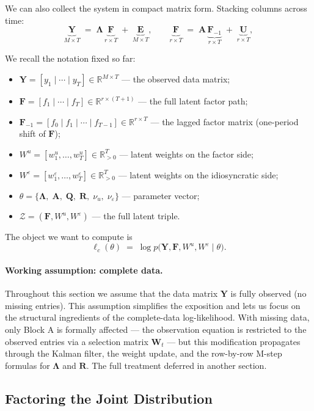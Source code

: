 \documentclass[11pt, a4paper, oneside]{article}
\newcommand{\mY}{\mathbf{Y}}
\newcommand{\mF}{\mathbf{F}}
\newcommand{\mL}{\boldsymbol{\Lambda}}
\newcommand{\mE}{\mathbf{E}}
\newcommand{\mA}{\mathbf{A}}
\newcommand{\mR}{\mathbf{R}}
\newcommand{\mQ}{\mathbf{Q}}
\begin{document}
We can also collect the system in compact matrix form. Stacking columns
across time:
\[
\underbrace{\mY}_{M \times T} \;=\; \mL\,\underbrace{\mF}_{r \times T} \;+\; \underbrace{\mE}_{M \times T},
\qquad
\underbrace{\mF}_{r \times T} \;=\; \mA\,\underbrace{\mF_{-1}}_{r \times T} \;+\; \underbrace{\mathbf{U}}_{r \times T},
\]


We recall the notation fixed so far:
\begin{itemize}[leftmargin=1.5em, itemsep=2pt]
    \item $\mY = [y_1 \mid \cdots \mid y_T] \in \mathbb{R}^{M \times T}$ — the observed data matrix;
    \item $\mF = [f_1 \mid \cdots \mid f_T] \in \mathbb{R}^{r \times (T+1)}$ — the full latent factor path;
    \item $\mF_{-1} = [f_0 \mid f_1 \mid \cdots \mid f_{T-1}] \in \mathbb{R}^{r \times T}$ — the lagged factor matrix (one-period shift of $\mF$);
    \item $W^u = [w^u_1, \ldots, w^u_T] \in \mathbb{R}^{T}_{>0}$ — latent weights on the factor side;
    \item $W^\varepsilon = [w^\varepsilon_1, \ldots, w^\varepsilon_T] \in \mathbb{R}^{T}_{>0}$ — latent weights on the idiosyncratic side;
    \item $\theta = \{\mL,\; \mA,\; \mQ,\; \mR,\; \nu_u,\; \nu_\varepsilon\}$ — parameter vector;
    \item $\mathcal{Z} = (\mF, W^u, W^\varepsilon)$ — the full latent triple.
\end{itemize}
The object we want to compute is
\[
\ell_c(\theta) \;=\; \log p\big(\mY, \mF, W^u, W^\varepsilon \mid \theta\big).
\]

\paragraph{Working assumption: complete data.}
Throughout this section we assume that the data matrix $\mY$ is fully
observed (no missing entries). This assumption simplifies the
exposition and lets us focus on the structural ingredients of the
complete-data log-likelihood. With missing data, only Block A is
formally affected — the observation equation is restricted to the
observed entries via a selection matrix $\mathbf{W}_t$ — but this
modification propagates through the Kalman filter, the weight update,
and the row-by-row M-step formulas for $\mL$ and $\mR$. The full
treatment deferred in another section.

\subsection{Factoring the Joint Distribution}
\end{document}
